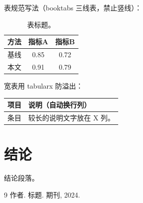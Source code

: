 \documentclass[11pt,a4paper]{article}
\begin{document}
表规范写法（booktabs 三线表，禁止竖线）：
\begin{table}[htbp]
  \centering
  \caption{表标题。}\label{tab:demo}
  \begin{tabular}{lcc}
    \toprule
    方法 & 指标A & 指标B \\
    \midrule
    基线 & 0.85 & 0.72 \\
    本文 & 0.91 & 0.79 \\
    \bottomrule
  \end{tabular}
\end{table}

宽表用 tabularx 防溢出：
\begin{table}[htbp]
  \centering
  \begin{tabularx}{\linewidth}{lX}
    \toprule
    项目 & 说明（自动换行列） \\
    \midrule
    条目 & 较长的说明文字放在 X 列。 \\
    \bottomrule
  \end{tabularx}
\end{table}

\section{结论}\label{sec:conclusion}
结论段落。

\begin{thebibliography}{9}
 作者. 标题. 期刊, 2024.
\end{thebibliography}

% 
% 
\end{document}
